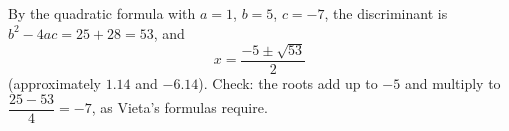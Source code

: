 By the quadratic formula with $a=1$, $b=5$, $c=-7$, the discriminant is $b^2-4ac=25+28=53$, and
\[x=\boxed{\dfrac{-5\pm\sqrt{53}}{2}}\]
(approximately $1.14$ and $-6.14$). Check: the roots add up to $-5$ and multiply to $\dfrac{25-53}{4}=-7$, as Vieta's formulas require.
